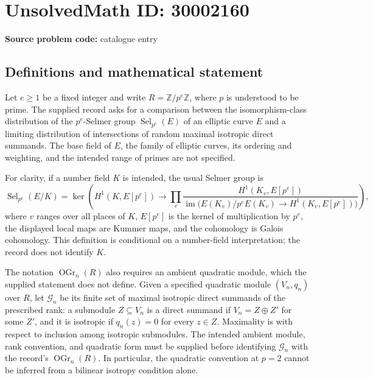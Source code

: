 \documentclass[11pt]{article}
\newcommand{\Z}{\mathbb{Z}}
\begin{document}
\section*{UnsolvedMath ID: 30002160}
\textbf{Source problem code:} catalogue entry
\subsection{Definitions and mathematical statement}
Let \(e\geq 1\) be a fixed integer and write \(R=\Z/p^e\Z\), where \(p\) is understood to be prime. The supplied record asks for a comparison between the isomorphism-class distribution of the \(p^e\)-Selmer group \(\operatorname{Sel}_{p^e}(E)\) of an elliptic curve \(E\) and a limiting distribution of intersections of random maximal isotropic direct summands. The base field of \(E\), the family of elliptic curves, its ordering and weighting, and the intended range of primes are not specified.

For clarity, if a number field \(K\) is intended, the usual Selmer group is
\[
\operatorname{Sel}_{p^e}(E/K)
=\ker\!\left(
H^1(K,E[p^e])\longrightarrow
\prod_v
\frac{H^1(K_v,E[p^e])}
{\operatorname{im}\bigl(E(K_v)/p^eE(K_v)\longrightarrow H^1(K_v,E[p^e])\bigr)}
\right),
\]
where \(v\) ranges over all places of \(K\), \(E[p^e]\) is the kernel of multiplication by \(p^e\), the displayed local maps are Kummer maps, and the cohomology is Galois cohomology. This definition is conditional on a number-field interpretation; the record does not identify \(K\).

The notation \(\operatorname{OGr}_n(R)\) also requires an ambient quadratic module, which the supplied statement does not define. Given a specified quadratic module \((V_n,q_n)\) over \(R\), let \(\mathcal G_n\) be its finite set of maximal isotropic direct summands of the prescribed rank: a submodule \(Z\subseteq V_n\) is a direct summand if \(V_n=Z\oplus Z'\) for some \(Z'\), and it is isotropic if \(q_n(z)=0\) for every \(z\in Z\). Maximality is with respect to inclusion among isotropic submodules. The intended ambient module, rank convention, and quadratic form must be supplied before identifying \(\mathcal G_n\) with the record's \(\operatorname{OGr}_n(R)\). In particular, the quadratic convention at \(p=2\) cannot be inferred from a bilinear isotropy condition alone.
\end{document}
